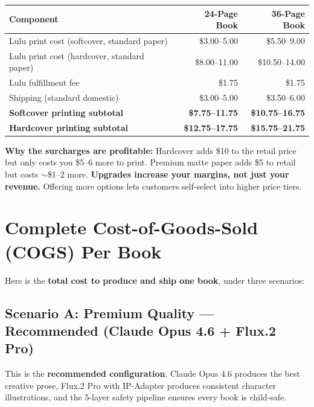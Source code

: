 \documentclass[12pt, letterpaper, oneside]{book}
\begin{document}
\begin{table}[H]
\centering
\begin{tabular}{lrr}
\toprule
\textbf{Component} & \textbf{24-Page Book} & \textbf{36-Page Book} \\
\midrule
Lulu print cost (softcover, standard paper) & \$3.00--5.00 & \$5.50--9.00 \\
Lulu print cost (hardcover, standard paper) & \$8.00--11.00 & \$10.50--14.00 \\
Lulu fulfillment fee & \$1.75 & \$1.75 \\
Shipping (standard domestic) & \$3.00--5.00 & \$3.50--6.00 \\
\midrule
\textbf{Softcover printing subtotal} & \textbf{\$7.75--11.75} & \textbf{\$10.75--16.75} \\
\textbf{Hardcover printing subtotal} & \textbf{\$12.75--17.75} & \textbf{\$15.75--21.75} \\
\bottomrule
\end{tabular}
\end{table}

\begin{infobox}
\textbf{Why the surcharges are profitable:} Hardcover adds \$10 to the retail price but only costs you \$5--6 more to print. Premium matte paper adds \$5 to retail but costs $\sim$\$1--2 more. \textbf{Upgrades increase your margins, not just your revenue.} Offering more options lets customers self-select into higher price tiers.
\end{infobox}

\section{Complete Cost-of-Goods-Sold (COGS) Per Book}

Here is the \textbf{total cost to produce and ship one book}, under three scenarios:

\subsection{Scenario A: Premium Quality --- Recommended (Claude Opus 4.6 + Flux.2 Pro)}

This is the \textbf{recommended configuration}. Claude Opus 4.6 produces the best creative prose, Flux.2 Pro with IP-Adapter produces consistent character illustrations, and the 5-layer safety pipeline ensures every book is child-safe.
\end{document}
